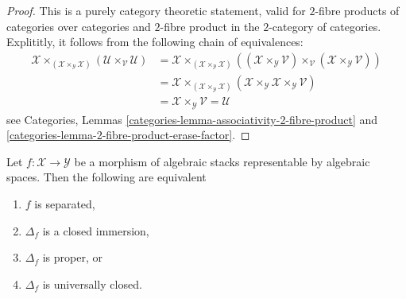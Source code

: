 \begin{proof}
This is a purely category theoretic statement, valid for $2$-fibre products
of categories over categories and $2$-fibre product in the $2$-category of
categories. Explititly, it follows from the following chain of equivalences:
\begin{align*}
\mathcal{X} \times_{(\mathcal{X} \times_{\mathcal{Y}} \mathcal{X})}
(\mathcal{U} \times_{\mathcal{V}} \mathcal{U})
& =
\mathcal{X} \times_{(\mathcal{X} \times_{\mathcal{Y}} \mathcal{X})}
((\mathcal{X} \times_{\mathcal{Y}} \mathcal{V})
\times_{\mathcal{V}} (\mathcal{X} \times_{\mathcal{Y}} \mathcal{V})) \\
& =
\mathcal{X} \times_{(\mathcal{X} \times_{\mathcal{Y}} \mathcal{X})}
(\mathcal{X} \times_{\mathcal{Y}} \mathcal{X}
\times_{\mathcal{Y}} \mathcal{V}) \\
& =
\mathcal{X} \times_{\mathcal{Y}} \mathcal{V} = \mathcal{U}
\end{align*}
see
Categories, Lemmas \ref{categories-lemma-associativity-2-fibre-product} and
\ref{categories-lemma-2-fibre-product-erase-factor}.
\end{proof}

\begin{lemma}
\label{lemma-representable-separated-diagonal-closed}
Let $f : \mathcal{X} \to \mathcal{Y}$ be a morphism of algebraic stacks
representable by algebraic spaces. Then the following are equivalent
\begin{enumerate}
\item $f$ is separated,
\item $\Delta_f$ is a closed immersion,
\item $\Delta_f$ is proper, or
\item $\Delta_f$ is universally closed.
\end{enumerate}
\end{lemma}

